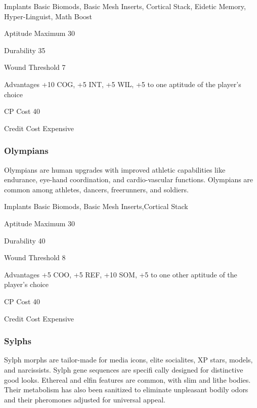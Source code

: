 \begin{description*} \item[Implants] Basic Biomods, Basic Mesh Inserts, Cortical Stack, Eidetic Memory, Hyper-Linguist, Math Boost \item[Aptitude Maximum] 30 \item[Durability] 35 \item[Wound Threshold] 7 \item[Advantages] +10 COG, +5 INT, +5 WIL, +5 to one aptitude of the player’s choice \item[CP Cost] 40 \item[Credit Cost] Expensive \end{description*} 

\subsubsection{Olympians} \label{sec:starting-olympians} 

Olympians are human upgrades with improved athletic capabilities like endurance, eye-hand coordination, and cardio-vascular functions. Olympians are common among athletes, dancers, freerunners, and soldiers. 

\begin{description*} \item[Implants] Basic Biomods, Basic Mesh Inserts,Cortical Stack \item[Aptitude Maximum] 30 \item[Durability] 40 \item[Wound Threshold] 8 \item[Advantages] +5 COO, +5 REF, +10 SOM, +5 to one other aptitude of the player’s choice \item[CP Cost] 40 \item[Credit Cost] Expensive \end{description*} 

\subsubsection{Sylphs} \label{sec:starting-sylphs} 

Sylph morphs are tailor-made for media icons, elite socialites, XP stars, models, and narcissists. Sylph gene sequences are specifi cally designed for distinctive good looks. Ethereal and elfin features are common, with slim and lithe bodies. Their metabolism has also been sanitized to eliminate unpleasant bodily odors and their pheromones adjusted for universal appeal. 

